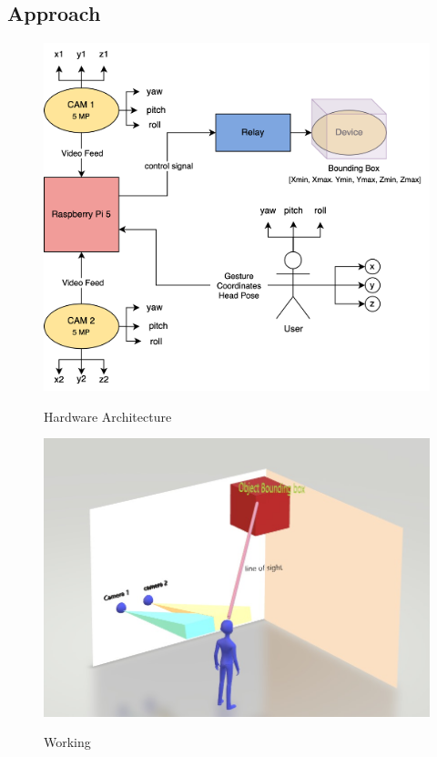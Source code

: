 \subsection{Approach}
\begin{figure}[!t]
	\centering
	\includegraphics[scale=1]{images/hardware_architecture.png} \\
	\caption{Hardware Architecture}
	\label{fig: Hardware Architecture}
\end{figure}
\begin{figure}[!t]
	\centering
	\includegraphics[scale=0.3]{images/approach.jpeg} \\
	\caption{Working}
	\label{fig: Working}
\end{figure}

